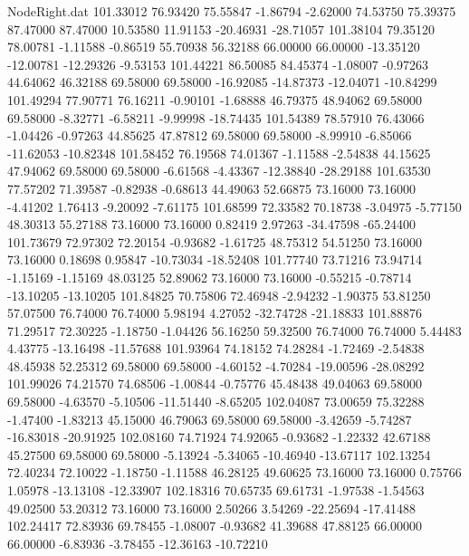 \begin{filecontents}{NodeRight.dat}
 101.33012   76.93420   75.55847    -1.86794   -2.62000   74.53750   75.39375   87.47000   87.47000   10.53580   11.91153  -20.46931  -28.71057
 101.38104   79.35120   78.00781    -1.11588   -0.86519   55.70938   56.32188   66.00000   66.00000  -13.35120  -12.00781  -12.29326   -9.53153
 101.44221   86.50085   84.45374    -1.08007   -0.97263   44.64062   46.32188   69.58000   69.58000  -16.92085  -14.87373  -12.04071  -10.84299
 101.49294   77.90771   76.16211    -0.90101   -1.68888   46.79375   48.94062   69.58000   69.58000   -8.32771   -6.58211   -9.99998  -18.74435
 101.54389   78.57910   76.43066    -1.04426   -0.97263   44.85625   47.87812   69.58000   69.58000   -8.99910   -6.85066  -11.62053  -10.82348
 101.58452   76.19568   74.01367    -1.11588   -2.54838   44.15625   47.94062   69.58000   69.58000   -6.61568   -4.43367  -12.38840  -28.29188
 101.63530   77.57202   71.39587    -0.82938   -0.68613   44.49063   52.66875   73.16000   73.16000   -4.41202    1.76413   -9.20092   -7.61175
 101.68599   72.33582   70.18738    -3.04975   -5.77150   48.30313   55.27188   73.16000   73.16000    0.82419    2.97263  -34.47598  -65.24400
 101.73679   72.97302   72.20154    -0.93682   -1.61725   48.75312   54.51250   73.16000   73.16000    0.18698    0.95847  -10.73034  -18.52408
 101.77740   73.71216   73.94714    -1.15169   -1.15169   48.03125   52.89062   73.16000   73.16000   -0.55215   -0.78714  -13.10205  -13.10205
 101.84825   70.75806   72.46948    -2.94232   -1.90375   53.81250   57.07500   76.74000   76.74000    5.98194    4.27052  -32.74728  -21.18833
 101.88876   71.29517   72.30225    -1.18750   -1.04426   56.16250   59.32500   76.74000   76.74000    5.44483    4.43775  -13.16498  -11.57688
 101.93964   74.18152   74.28284    -1.72469   -2.54838   48.45938   52.25312   69.58000   69.58000   -4.60152   -4.70284  -19.00596  -28.08292
 101.99026   74.21570   74.68506    -1.00844   -0.75776   45.48438   49.04063   69.58000   69.58000   -4.63570   -5.10506  -11.51440   -8.65205
 102.04087   73.00659   75.32288    -1.47400   -1.83213   45.15000   46.79063   69.58000   69.58000   -3.42659   -5.74287  -16.83018  -20.91925
 102.08160   74.71924   74.92065    -0.93682   -1.22332   42.67188   45.27500   69.58000   69.58000   -5.13924   -5.34065  -10.46940  -13.67117
 102.13254   72.40234   72.10022    -1.18750   -1.11588   46.28125   49.60625   73.16000   73.16000    0.75766    1.05978  -13.13108  -12.33907
 102.18316   70.65735   69.61731    -1.97538   -1.54563   49.02500   53.20312   73.16000   73.16000    2.50266    3.54269  -22.25694  -17.41488
 102.24417   72.83936   69.78455    -1.08007   -0.93682   41.39688   47.88125   66.00000   66.00000   -6.83936   -3.78455  -12.36163  -10.72210

\end{filecontents}
